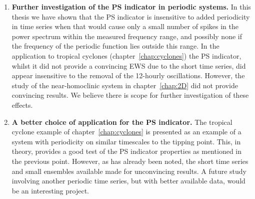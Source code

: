 \begin{enumerate}
	\item {\bf Further investigation of the PS indicator in periodic systems.} In this thesis we have shown that the PS indicator is insensitive to added periodicity in time series when that would cause only a small number of spikes in the power spectrum within the measured frequency range, and possibly none if the frequency of the periodic function lies outside this range. In the application to tropical cyclones (chapter~\ref{chap:cyclones}) the PS indicator, whilst it did not provide a convincing EWS due to the short time series, did appear insensitive to the removal of the 12-hourly oscillations. However, the study of the near-homoclinic system in chapter~\ref{chap:2D} did not provide convincing results. We believe there is scope for further investigation of these effects.
	
	\item {\bf A better choice of application for the PS indicator.} The tropical cyclone example of chapter~\ref{chap:cyclones} is presented as an example of a system with periodicity on similar timescales to the tipping point. This, in theory, provides a good test of the PS indicator properties as mentioned in the previous point. However, as has already been noted, the short time series and small ensembles available made for unconvincing results. A future study involving another periodic time series, but with better available data, would be an interesting project.
	

\end{enumerate}
